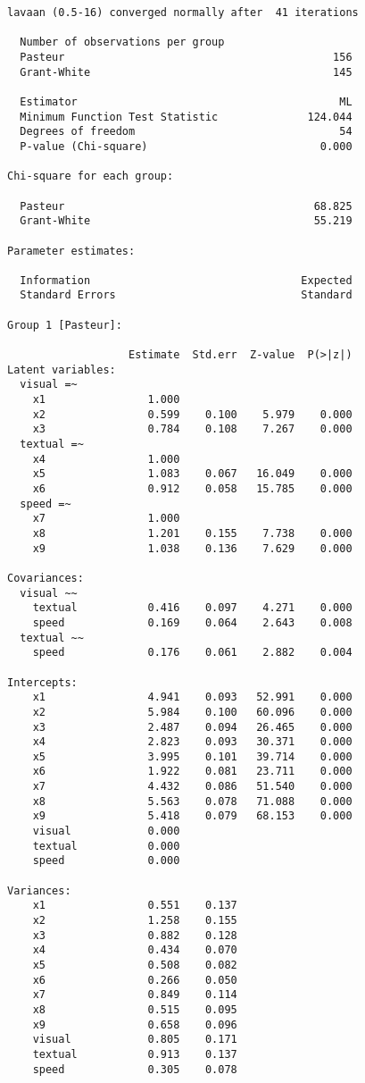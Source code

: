 \begin{verbatim}
lavaan (0.5-16) converged normally after  41 iterations

  Number of observations per group         
  Pasteur                                          156
  Grant-White                                      145

  Estimator                                         ML
  Minimum Function Test Statistic              124.044
  Degrees of freedom                                54
  P-value (Chi-square)                           0.000

Chi-square for each group:

  Pasteur                                       68.825
  Grant-White                                   55.219

Parameter estimates:

  Information                                 Expected
  Standard Errors                             Standard

Group 1 [Pasteur]:

                   Estimate  Std.err  Z-value  P(>|z|)
Latent variables:
  visual =~
    x1                1.000
    x2                0.599    0.100    5.979    0.000
    x3                0.784    0.108    7.267    0.000
  textual =~
    x4                1.000
    x5                1.083    0.067   16.049    0.000
    x6                0.912    0.058   15.785    0.000
  speed =~
    x7                1.000
    x8                1.201    0.155    7.738    0.000
    x9                1.038    0.136    7.629    0.000

Covariances:
  visual ~~
    textual           0.416    0.097    4.271    0.000
    speed             0.169    0.064    2.643    0.008
  textual ~~
    speed             0.176    0.061    2.882    0.004

Intercepts:
    x1                4.941    0.093   52.991    0.000
    x2                5.984    0.100   60.096    0.000
    x3                2.487    0.094   26.465    0.000
    x4                2.823    0.093   30.371    0.000
    x5                3.995    0.101   39.714    0.000
    x6                1.922    0.081   23.711    0.000
    x7                4.432    0.086   51.540    0.000
    x8                5.563    0.078   71.088    0.000
    x9                5.418    0.079   68.153    0.000
    visual            0.000
    textual           0.000
    speed             0.000

Variances:
    x1                0.551    0.137
    x2                1.258    0.155
    x3                0.882    0.128
    x4                0.434    0.070
    x5                0.508    0.082
    x6                0.266    0.050
    x7                0.849    0.114
    x8                0.515    0.095
    x9                0.658    0.096
    visual            0.805    0.171
    textual           0.913    0.137
    speed             0.305    0.078




\end{verbatim}
